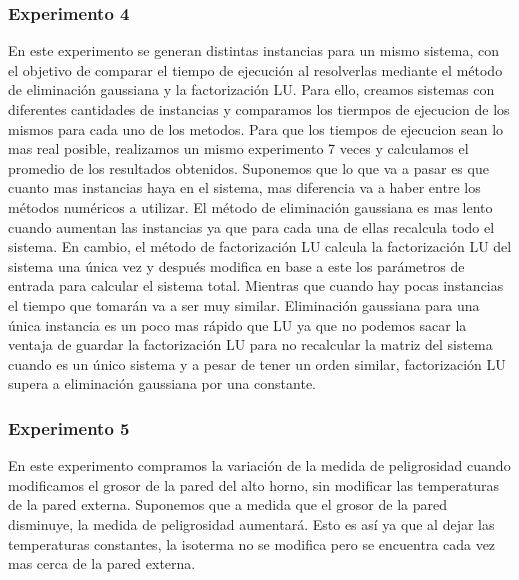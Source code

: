   	\subsubsection*{Experimento 4}
  		En este experimento se generan distintas instancias para un mismo sistema, con el objetivo de comparar el tiempo de ejecución al resolverlas mediante el método de eliminación gaussiana y la factorización LU. 
  		Para ello, creamos sistemas con diferentes cantidades de instancias y comparamos los tiermpos de ejecucion de los mismos para cada uno de los metodos.
  		Para que los tiempos de ejecucion sean lo mas real posible, realizamos un mismo experimento 7 veces y calculamos el promedio de los resultados obtenidos.
  		Suponemos que lo que va a pasar es que cuanto mas instancias haya en el sistema, mas diferencia va a haber entre los métodos numéricos a utilizar. El método de eliminación gaussiana es mas lento cuando aumentan las instancias ya que para cada una de ellas recalcula todo el sistema. En cambio, el método de factorización LU calcula la factorización LU del sistema una única vez y después modifica en base a este los parámetros de entrada para calcular el sistema total. Mientras que cuando hay pocas instancias el tiempo que tomarán va a ser muy similar. Eliminación gaussiana para una única instancia es un poco mas rápido que LU ya que no podemos sacar la ventaja de guardar la factorización LU para no recalcular la matriz del sistema cuando es un único sistema y a pesar de tener un orden similar, factorización LU supera a eliminación gaussiana por una constante.

  	\subsubsection*{Experimento 5}
  		En este experimento compramos la variación de la medida de peligrosidad cuando modificamos el grosor de la pared del alto horno, sin modificar las temperaturas de la pared externa.
		Suponemos que a medida que el grosor de la pared disminuye, la medida de peligrosidad aumentará. Esto es así ya que al dejar las temperaturas constantes, la isoterma no se modifica pero se encuentra cada vez mas cerca de la pared externa.

